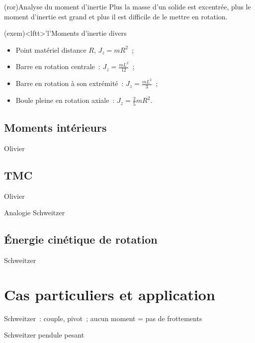 \documentclass[../../main/main.tex]{subfiles}
\begin{document}
\begin{tcb*}(ror){Analyse du moment d'inertie}
	Plus la masse d'un solide est excentrée, plus le moment d'inertie
	est grand et plus il est difficile de le mettre en rotation.
\end{tcb*}

\begin{tcb*}(exem)<lftt>'l'{Moments d'inertie divers}
	\begin{itemize}
		\item Point matériel distance $R$, $J_z = mR^2$~;
		\item Barre en rotation centrale~: $J_z = \frac{mL^2}{12}$~;
		\item Barre en rotation à son extrémité~: $J_z = \frac{mL^2}{3}$~;
		\item Boule pleine en rotation axiale~: $J_z = \frac{2}{5}mR^2$.
	\end{itemize}
\end{tcb*}
\subsection{Moments intérieurs}
Olivier

\subsection{TMC}
Olivier

Analogie Schweitzer

\subsection{Énergie cinétique de rotation}
Schweitzer

\section{Cas particuliers et application}
Schweitzer~: couple, pivot~; aucun moment = pas de frottements

Schweitzer pendule pesant
\end{document}
